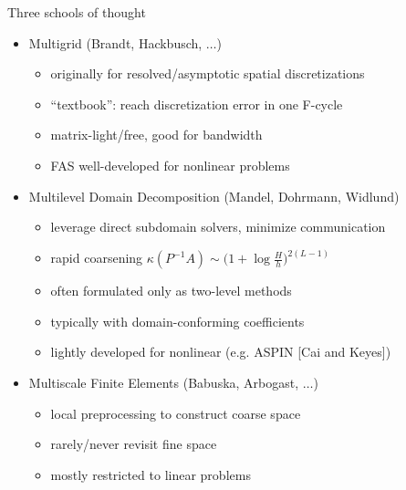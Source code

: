 \begin{frame}{Three schools of thought}
  \begin{itemize}
  \item Multigrid (Brandt, Hackbusch, $\dotsc$)
    \begin{itemize}
    \item originally for resolved/asymptotic spatial discretizations
    \item ``textbook'': reach discretization error in one F-cycle
    \item matrix-light/free, good for bandwidth
    \item FAS well-developed for nonlinear problems
    \end{itemize}
  \item Multilevel Domain Decomposition (Mandel, Dohrmann, Widlund)
    \begin{itemize}
    \item leverage direct subdomain solvers, minimize communication
    \item rapid coarsening $\kappa(P^{-1}A) \sim \big(1 + \log \frac H h \big)^{2(L-1)}$
    \item often formulated only as two-level methods
    \item typically with domain-conforming coefficients
    \item lightly developed for nonlinear (e.g. ASPIN [Cai and Keyes])
    \end{itemize}
  \item Multiscale Finite Elements (Babuska, Arbogast, $\dotsc$)
    \begin{itemize}
    \item local preprocessing to construct coarse space
    \item rarely/never revisit fine space
    \item mostly restricted to linear problems
    \end{itemize}
  \end{itemize}
\end{frame}

